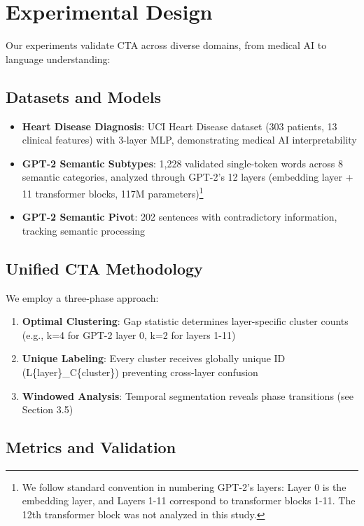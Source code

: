 \section{Experimental Design}

Our experiments validate CTA across diverse domains, from medical AI to language understanding:

\subsection{Datasets and Models}

\begin{itemize}
    \item \textbf{Heart Disease Diagnosis}: UCI Heart Disease dataset (303 patients, 13 clinical features) with 3-layer MLP, demonstrating medical AI interpretability
    \item \textbf{GPT-2 Semantic Subtypes}: 1,228 validated single-token words across 8 semantic categories, analyzed through GPT-2's 12 layers (embedding layer + 11 transformer blocks, 117M parameters)\footnote{We follow standard convention in numbering GPT-2's layers: Layer 0 is the embedding layer, and Layers 1-11 correspond to transformer blocks 1-11. The 12th transformer block was not analyzed in this study.}
    \item \textbf{GPT-2 Semantic Pivot}: 202 sentences with contradictory information, tracking semantic processing
\end{itemize}

\subsection{Unified CTA Methodology}

We employ a three-phase approach:

\begin{enumerate}
    \item \textbf{Optimal Clustering}: Gap statistic determines layer-specific cluster counts (e.g., k=4 for GPT-2 layer 0, k=2 for layers 1-11)
    \item \textbf{Unique Labeling}: Every cluster receives globally unique ID (L\{layer\}\_C\{cluster\}) preventing cross-layer confusion
    \item \textbf{Windowed Analysis}: Temporal segmentation reveals phase transitions (see Section 3.5)
\end{enumerate}

\subsection{Metrics and Validation}

